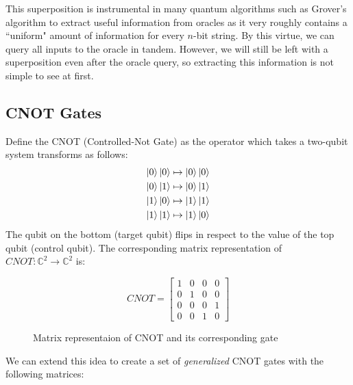 \documentclass[quantum.tex]{subfiles}
\begin{document}
This superposition is instrumental in many quantum algorithms such as Grover's algorithm to extract useful information from oracles as it very roughly contains a ``uniform" amount of information for every $n$-bit string. By this virtue, we can query all inputs to the oracle in tandem. However, we will still be left with a superposition even after the oracle query, so extracting this information is not simple to see at first.

\subsection{CNOT Gates}
Define the CNOT (Controlled-Not Gate) as the operator which takes a two-qubit system transforms as follows:
\begin{gather*}
  \ket{0}\ket{0} \mapsto \ket{0}\ket{0} \\
  \ket{0}\ket{1} \mapsto \ket{0}\ket{1} \\
  \ket{1}\ket{0} \mapsto \ket{1}\ket{1} \\
  \ket{1}\ket{1} \mapsto \ket{1}\ket{0}
\end{gather*}
The qubit on the bottom (target qubit) flips in respect to the value of the top qubit (control qubit). The corresponding matrix representation of $CNOT: \mathbb{C}^2 \rightarrow \mathbb{C}^2$ is:

\begin{figure}[h]
  \centering
  \leavevmode
  \begin{equation}
    CNOT = \begin{bmatrix}1 & 0 & 0 & 0 \\ 0 & 1 & 0 & 0 \\ 0 & 0 & 0 & 1 \\ 0 & 0 & 1 & 0 \end{bmatrix}
  \end{equation}
    \caption{Matrix representaion of CNOT and its corresponding gate}
\end{figure}

We can extend this idea to create a set of \textit{generalized} CNOT gates with the following matrices:
\end{document}

